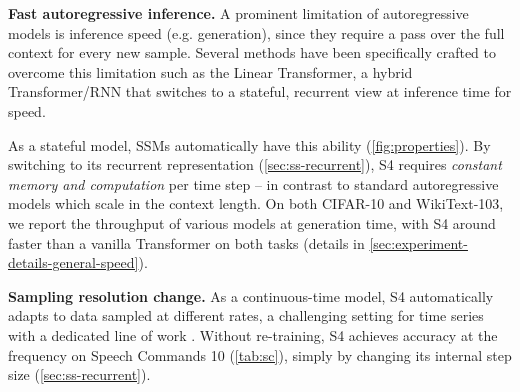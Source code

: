 \documentclass{article}
\newcommand{\methodabbrv}{S4}
\begin{document}
\textbf{Fast autoregressive inference.}
A prominent limitation of autoregressive models is inference speed (e.g. generation),
since they require a pass over the full context for every new sample.
Several methods have been specifically crafted to overcome this limitation such as the Linear Transformer, a hybrid Transformer/RNN that switches to a stateful, recurrent view at inference time for speed.

As a stateful model, SSMs automatically have this ability (\cref{fig:properties}).
By switching to its recurrent representation (\cref{sec:ss-recurrent}),
\methodabbrv{} requires \emph{constant memory and computation} per time step -- in contrast to standard autoregressive models which scale in the context length.
On both CIFAR-10 and WikiText-103,
we report the throughput of various models at generation time, with \methodabbrv{} around  faster than a vanilla Transformer on both tasks (details in \cref{sec:experiment-details-general-speed}).


\textbf{Sampling resolution change.}
As a continuous-time model, \methodabbrv{} automatically adapts to data sampled at different rates,
a challenging setting for time series with a dedicated line of work \citep{rubanova2019latent,de2019gru,romero2021ckconv}.
Without re-training, \methodabbrv{} achieves  accuracy at  the frequency on Speech Commands 10 (\cref{tab:sc}), simply by changing its internal step size  (\cref{sec:ss-recurrent}).
\end{document}

